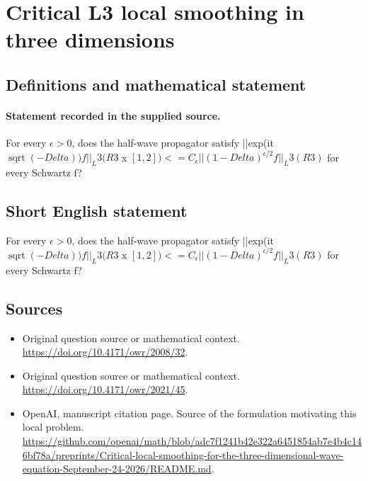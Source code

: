\documentclass[11pt]{article}
\begin{document}
\section*{Critical L3 local smoothing in three dimensions}\label{30007424}
\subsection{Definitions and mathematical statement}
\paragraph{Statement recorded in the supplied source.}
For every $\epsilon >0$, does the half-wave propagator satisfy ||exp(it $\operatorname{sqrt}(-Delta))f||_L3(R3$ x $[1,2])<=C_\epsilon ||(1-Delta)^{\epsilon /2}f||_L3(R3)$ for every Schwartz f?
\subsection{Short English statement}
For every $\epsilon >0$, does the half-wave propagator satisfy ||exp(it $\operatorname{sqrt}(-Delta))f||_L3(R3$ x $[1,2])<=C_\epsilon ||(1-Delta)^{\epsilon /2}f||_L3(R3)$ for every Schwartz f?
\subsection{Sources}
\begin{itemize}
\item[S1] Original question source or mathematical context.
\url{https://doi.org/10.4171/owr/2008/32}.
\item[S2] Original question source or mathematical context.
\url{https://doi.org/10.4171/owr/2021/45}.
\item[S3] OpenAI, manuscript citation page. Source of the formulation motivating this local problem.
\url{https://github.com/openai/math/blob/adc7f1241b42e322a6451854ab7e4b4c146bf78a/preprints/Critical-local-smoothing-for-the-three-dimensional-wave-equation-September-24-2026/README.md}.
\end{itemize}
\end{document}
